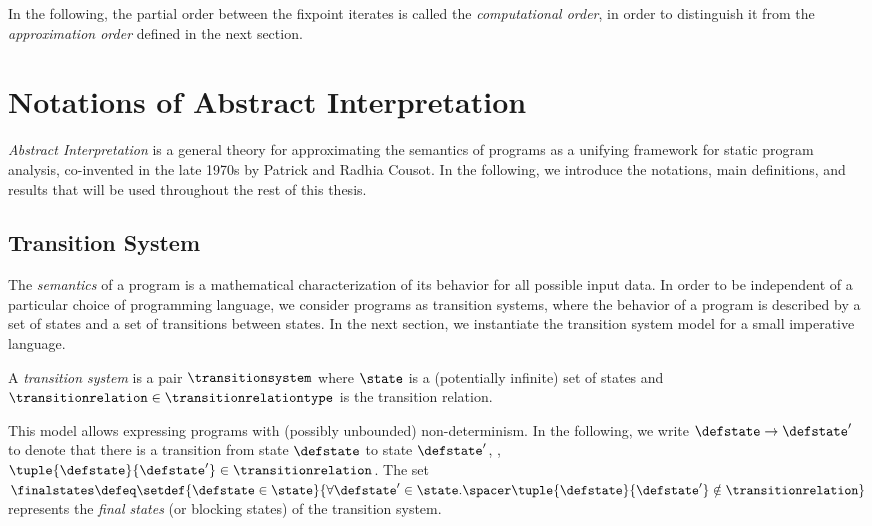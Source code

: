 In the following, the partial order between the fixpoint iterates is called the \emph{computational order}, in order to distinguish it from the \emph{approximation order} defined in the next section.

\section{Notations of Abstract Interpretation}

\emph{Abstract Interpretation}  is a general theory for approximating the semantics of programs as a unifying framework for static program analysis, co-invented in the late 1970s by Patrick and Radhia Cousot.
In the following, we introduce the notations, main definitions, and results that will be used throughout the rest of this thesis.

\subsection{Transition System}

The \emph{semantics} of a program is a mathematical characterization of its behavior for all possible input data.
In order to be independent of a particular choice of programming language, we consider programs as transition systems, where the behavior of a program is described by a set of states and a set of transitions between states.
In the next section, we instantiate the transition system model for a small imperative language.

\begin{definition}
  A \emph{transition system} is a pair $\transitionsystem$ where $\state$ is a (potentially infinite) set of states and $\transitionrelation \in \transitionrelationtype$ is the transition relation.
\end{definition}

This model allows expressing programs with (possibly unbounded) non-determinism.
In the following, we write $\defstate \rightarrow \defstate'$ to denote that there is a transition from state $\defstate$ to state $\defstate'$, \ie, $\tuple{\defstate}{\defstate'} \in \transitionrelation$.
The set $\finalstates \defeq \setdef{\defstate \in \state}{\forall \defstate' \in \state.\spacer \tuple{\defstate}{\defstate'} \notin \transitionrelation}$ represents the \emph{final states} (or blocking states) of the transition system.


